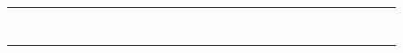 \documentclass[10pt]{article}
\begin{document}
\begin{center}
\begin{tabular}{|c|c|c|c|c|c|c|c|c|c|c|c|c|c|c|c|c|c|c|c|c|c|c|c|c|c|c|c|c|c|c|}
\hline
 &  &  &  &  &  &  &  &  &  &  &  &  &  &  &  &  &  &  &  &  &  &  &  &  &  &  &  &  &  &  \\
\hline
 &  &  &  &  &  &  &  &  &  &  &  &  &  &  &  &  &  &  &  &  &  &  &  &  &  &  &  &  &  &  \\
\hline
 &  &  &  &  &  &  &  &  &  &  &  &  &  &  &  &  &  &  &  &  &  &  &  &  &  &  &  &  &  &  \\
\hline
 &  &  &  &  &  &  &  &  &  &  &  &  &  &  &  &  &  &  &  &  &  &  &  &  &  &  &  &  &  &  \\
\hline
 &  &  &  &  &  &  &  &  &  &  &  &  &  &  &  &  &  &  &  &  &  &  &  &  &  &  &  &  &  &  \\
\hline
 &  &  &  &  &  &  &  &  &  &  &  &  &  &  &  &  &  &  &  &  &  &  &  &  &  &  &  &  &  &  \\
\hline
 &  &  &  &  &  &  &  &  &  &  &  &  &  &  &  &  &  &  &  &  &  &  &  &  &  &  &  &  &  &  \\
\hline
 &  &  &  &  &  &  &  &  &  &  &  &  &  &  &  &  &  &  &  &  &  &  &  &  &  &  &  &  &  &  \\
\hline
 &  &  &  &  &  &  &  &  &  &  &  &  &  &  &  &  &  &  &  &  &  &  &  &  &  &  &  &  &  &  \\
\hline

\end{tabular}
\end{center}
\end{document}
